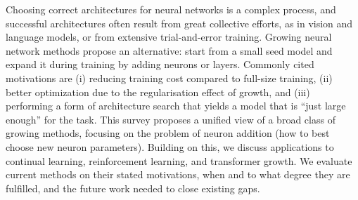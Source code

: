 Choosing correct architectures for neural networks is a complex process, and successful architectures often result from great collective efforts, as in vision and language models, or from extensive trial-and-error training. Growing neural network methods propose an alternative: start from a small seed model and expand it during training by \eg{} adding neurons or layers. Commonly cited motivations are (i) reducing training cost compared to full-size training, (ii) better optimization due to the regularisation effect of growth, and (iii) performing a form of architecture search that yields a model that is ``just large enough'' for the task. 
This survey proposes a unified view of a broad class of growing methods, focusing on the problem of neuron addition (how to best choose new neuron parameters). Building on this, we discuss applications to continual learning, reinforcement learning, and transformer growth.
We evaluate current methods on their stated motivations, when and to what degree they are fulfilled, and the future work needed to close existing gaps.
